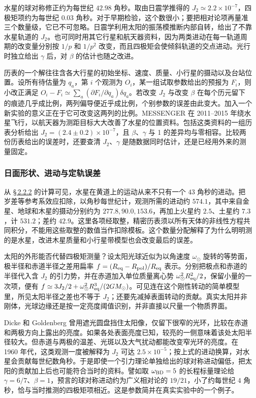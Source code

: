 水星的球对称修正约为每世纪 $42.98$ 角秒。取由日震学推得的 $J_2\simeq2.2\times10^{-7}$，四极矩项约为每世纪 $0.03$ 角秒。对于早期检验，这个数很小；要把相对论项再量准三个数量级，它已不可忽略。日震学利用太阳的振荡模推断内部自转，给出了不靠水星轨道的 $J_2$。也可同时用其它行星和航天器资料，因为两类进动在每一轨道周期的改变量分别按 $1/p$ 和 $1/p^2$ 改变，而且四极矩会使倾斜轨道的交点进动。光行时独立给出 $\gamma$ 后，对 $\beta$ 的估计也随之改进。

历表的一个解往往含各大行星的初始坐标、速度、质量、小行星的摄动以及台站位置。设所有待估量为 $q_a$，第 $i$ 个观测为 $O_i$，某一组试取参数给出的预报为 $F_i$，则小改正满足 $O_i-F_i\simeq\sum_a(\partial F_i/\partial q_a)\delta q_a$。若改变 $J_2$ 与改变 $\beta$ 在每个历元留下的痕迹几乎成比例，两列偏导便近乎成比例，个别参数的误差由此变大。加入一个新实验的意义正在于它可改变这两列的比例。MESSENGER 在 2011--2015 年绕水星飞行，以航天器为测距目标大大改善了水星的位置资料。包括这类资料的一组历表分析给出 $J_2=(2.4\pm0.2)\times10^{-7}$，且 $\beta$、$\gamma$ 与 1 的差异均与零相容。比较两份历表给出的误差时，还要查清 $J_2$、$\gamma$ 是随数据同时估计，还是已经用外来的测量固定。

\subsubsection{日面形状、进动与定轨误差}

从 \hyperlink{subsection.2.2.2}{\S\,2.2.2} 的计算可见，水星在黄道上的运动从来不只有一个 $43$ 角秒的进动。把岁差等参考系效应扣除，以角秒每世纪计，观测所需的进动约 $574.1$，其中来自金星、地球和木星的摄动分别约为 $277.8,90.0,153.6$，再加上火星约 $2.5$、土星约 $7.3$，计 $531.2$；差约 $42.9$。这里各项经取整，精密历表须以所有天体的非线性方程共同积分，不能用这些取整的数值当作扣除模板。这个数量分配解释了为什么明明测的是水星，改进木星质量和小行星带模型也会改变最后的误差。

太阳的外形能否代替四极矩测量？设太阳光球近似为以角速度 $\omega_\odot$ 旋转的等势面，极半径和赤道半径之差用扁率 $f=(R_{\rm eq}-R_{\rm pol})/R_{\rm eq}$ 表示。分别把极点和赤道的半径代入含 $J_2$ 的引力势，并在赤道加入单位质量离心势 $\omega_\odot^2R_{\rm eq}^2/2$，保留小量的一次项，便有 $f\simeq 3J_2/2+\omega_\odot^2R_{\rm eq}^3/(2GM_\odot)$。可见连在这个刚性转动的简单模型里，所见太阳半径之差也不等于 $J_2$；还要先减掉表面转动的贡献。真实太阳并非刚体，光球边缘还是按一定亮度阈值识别，并非直接以尺量一个物质界面。

Dicke 和 Goldenberg 曾用遮光圆盘挡住太阳像，仅留下很窄的光环，比较在赤道和两极方向上露出的亮度。如果各处表面亮度已知，较亮的一侧意味着该处太阳半径较大。但赤道与两极的温差、光斑以及大气扰动都能改变窄光环的亮度。在 1960 年代，这类观测一度被解释为 $J_2$ 可达 $2.5\times10^{-5}$；按上式的进动换算，对水星会贡献每世纪数角秒。于是即使一个引力理论单独给出的球对称进动偏低，把太阳的贡献加上后也可能符合当时的资料。譬如取 $\omega_{\rm BD}=5$ 的长程标量理论给 $\gamma=6/7$、$\beta=1$，预言的球对称进动约为广义相对论的 $19/21$，小了约每世纪 $4$ 角秒，恰与当时推测的四极矩项相近。这是参数简并在真实实验中的一个例子。

